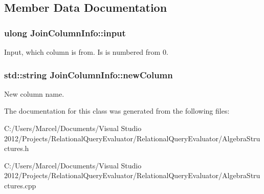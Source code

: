 \subsection{Member Data Documentation}
\hypertarget{class_join_column_info_a6a87e51d648e21dd6806d7a1bd6191da}{
\subsubsection[{input}]{\setlength{\rightskip}{0pt plus 5cm}ulong Join\+Column\+Info\+::input}}\label{class_join_column_info_a6a87e51d648e21dd6806d7a1bd6191da}
Input, which column is from. Is is numbered from 0. \hypertarget{class_join_column_info_a4fdb28a84e69012cdb314463f9c0d674}{
\subsubsection[{new\+Column}]{\setlength{\rightskip}{0pt plus 5cm}std\+::string Join\+Column\+Info\+::new\+Column}}\label{class_join_column_info_a4fdb28a84e69012cdb314463f9c0d674}
New column name. 

The documentation for this class was generated from the following files\+:\begin{DoxyCompactItemize}
\item 
C\+:/\+Users/\+Marcel/\+Documents/\+Visual Studio 2012/\+Projects/\+Relational\+Query\+Evaluator/\+Relational\+Query\+Evaluator/Algebra\+Structures.\+h\item 
C\+:/\+Users/\+Marcel/\+Documents/\+Visual Studio 2012/\+Projects/\+Relational\+Query\+Evaluator/\+Relational\+Query\+Evaluator/Algebra\+Structures.\+cpp\end{DoxyCompactItemize}
